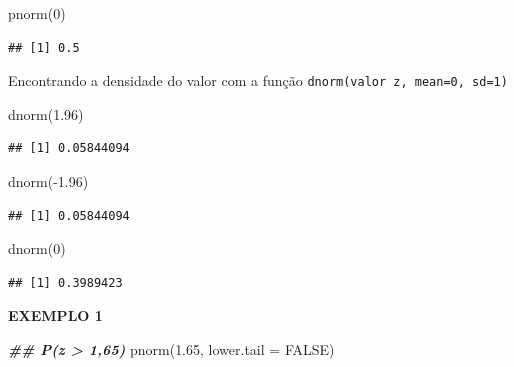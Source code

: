 \documentclass[
]{article}
\newenvironment{Shaded}{\begin{snugshade}}{\end{snugshade}}
\newcommand{\AttributeTok}[1]{\textcolor[rgb]{0.77,0.63,0.00}{#1}}
\newcommand{\ConstantTok}[1]{\textcolor[rgb]{0.00,0.00,0.00}{#1}}
\newcommand{\DecValTok}[1]{\textcolor[rgb]{0.00,0.00,0.81}{#1}}
\newcommand{\DocumentationTok}[1]{\textcolor[rgb]{0.56,0.35,0.01}{\textbf{\textit{#1}}}}
\newcommand{\FloatTok}[1]{\textcolor[rgb]{0.00,0.00,0.81}{#1}}
\newcommand{\FunctionTok}[1]{\textcolor[rgb]{0.00,0.00,0.00}{#1}}
\newcommand{\NormalTok}[1]{#1}
\newcommand{\SpecialCharTok}[1]{\textcolor[rgb]{0.00,0.00,0.00}{#1}}
\begin{document}
\begin{Shaded}
\begin{Highlighting}[]
\FunctionTok{pnorm}\NormalTok{(}\DecValTok{0}\NormalTok{)}
\end{Highlighting}
\end{Shaded}

\begin{verbatim}
## [1] 0.5
\end{verbatim}

Encontrando a densidade do valor com a função
\texttt{dnorm(valor\ z,\ mean=0,\ sd=1)}

\begin{Shaded}
\begin{Highlighting}[]
\FunctionTok{dnorm}\NormalTok{(}\FloatTok{1.96}\NormalTok{)}
\end{Highlighting}
\end{Shaded}

\begin{verbatim}
## [1] 0.05844094
\end{verbatim}

\begin{Shaded}
\begin{Highlighting}[]
\FunctionTok{dnorm}\NormalTok{(}\SpecialCharTok{{-}}\FloatTok{1.96}\NormalTok{)}
\end{Highlighting}
\end{Shaded}

\begin{verbatim}
## [1] 0.05844094
\end{verbatim}

\begin{Shaded}
\begin{Highlighting}[]
\FunctionTok{dnorm}\NormalTok{(}\DecValTok{0}\NormalTok{)}
\end{Highlighting}
\end{Shaded}

\begin{verbatim}
## [1] 0.3989423
\end{verbatim}

\textbf{EXEMPLO 1}

\begin{Shaded}
\begin{Highlighting}[]
\DocumentationTok{\#\# P(z \textgreater{} 1,65)}
\FunctionTok{pnorm}\NormalTok{(}\FloatTok{1.65}\NormalTok{, }\AttributeTok{lower.tail =} \ConstantTok{FALSE}\NormalTok{)}
\end{Highlighting}
\end{Shaded}
\end{document}
